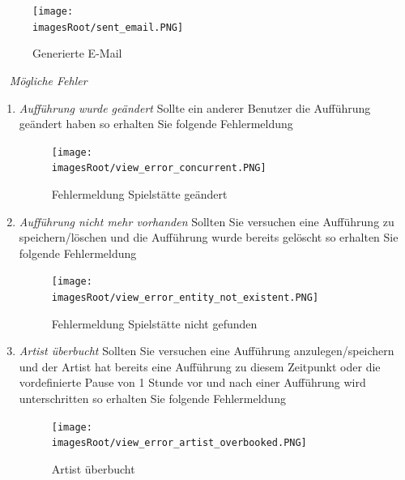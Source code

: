 \documentclass[11pt, a4paper, twoside]{article}   	%
\newcommand{\imagesRoot}{images}
\begin{document}
	\begin{figure}[h]
	\centering
	\texttt{[image: \\imagesRoot/sent\_email.PNG]}
	\caption
	{Generierte E-Mail}
\end{figure}
\ \newline
\newpage
\emph{Mögliche Fehler}
\begin{enumerate}
\item\emph{Aufführung wurde geändert}
\newline
Sollte ein anderer Benutzer die Aufführung geändert haben so erhalten Sie folgende Fehlermeldung
	\begin{figure}[h]
	\centering
	\texttt{[image: \\imagesRoot/view\_error\_concurrent.PNG]}
	\caption
	{Fehlermeldung Spielstätte geändert}
\end{figure}
\item\emph{Aufführung nicht mehr vorhanden}
\newline
Sollten Sie versuchen eine Aufführung zu speichern/löschen und die Aufführung wurde bereits gelöscht so erhalten Sie folgende Fehlermeldung
	\begin{figure}[h]
	\centering
	\texttt{[image: \\imagesRoot/view\_error\_entity\_not\_existent.PNG]}
	\caption
	{Fehlermeldung Spielstätte nicht gefunden}
\end{figure}	
\item\emph{Artist überbucht}
\newline
Sollten Sie versuchen eine Aufführung anzulegen/speichern und der Artist hat bereits eine Aufführung zu diesem Zeitpunkt oder die vordefinierte Pause von 1 Stunde vor und nach einer Aufführung wird unterschritten so erhalten Sie folgende Fehlermeldung
	\begin{figure}[h]
	\centering
	\texttt{[image: \\imagesRoot/view\_error\_artist\_overbooked.PNG]}
	\caption
	{Artist überbucht}
\end{figure}
\end{enumerate}
\ \newpage
\end{document}

